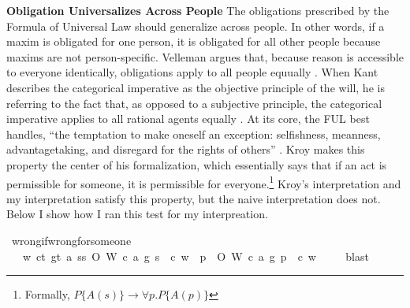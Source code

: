 \begin{isabellebody}
%
\begin{isamarkuptext}%
\medskip
\noindent \textbf{Obligation Universalizes Across People} The obligations prescribed by the Formula of Universal Law
should generalize across people. In other words, if a maxim is obligated for one person, it is obligated
for all other people because maxims are not person-specific. Velleman argues that, because 
reason is accessible to everyone identically, obligations apply to all people equually \citep[25]{velleman}. 
When Kant describes the categorical imperative as the objective principle of the will, he is referring 
to the fact that, as opposed to a subjective principle, the categorical imperative applies to all 
rational agents equally \citep[16]{groundwork}. At its core, the FUL best handles, ``the temptation 
to make oneself an exception: selfishness, meanness, advantagetaking, and disregard for the rights 
of others'' \citep[30]{KorsgaardFUL}. Kroy makes this property the center of his
formalization, which essentially says that if an act is permissible for someone, it is permissible for 
everyone.\footnote{Formally, $P\{A(s)\} \longrightarrow \forall p. P\{A(p)\}$} Kroy's interpretation and 
my interpretation satisfy this property, but the naive interpretation does not. Below I show how I 
ran this test for my interpreation.%
\end{isamarkuptext}\isamarkuptrue%
\isamarkupfalse%
\ wrong{\isacharunderscore}if{\isacharunderscore}wrong{\isacharunderscore}for{\isacharunderscore}someone{\isacharcolon}\isanewline
\ \ \ {\isachardoublequoteopen}{\isasymforall}w{\isachardot}\ {\isasymforall}c{\isacharcolon}{\isacharcolon}t{\isachardot}\ {\isasymforall}g{\isacharcolon}{\isacharcolon}t{\isachardot}\ {\isasymforall}a{\isachardot}\ {\isasymexists}s{\isacharcolon}{\isacharcolon}s{\isachardot}\ O{\isacharbraceleft}\isactrlbold {\isasymnot}\ {\isacharparenleft}W\ {\isacharparenleft}c{\isacharcomma}\ a{\isacharcomma}\ g{\isacharparenright}\ s{\isacharparenright}\ {\isacharbar}\ c{\isacharbraceright}\ w\ {\isasymlongrightarrow}\ {\isacharparenleft}{\isasymforall}p{\isachardot}\ \ O{\isacharbraceleft}\isactrlbold {\isasymnot}\ {\isacharparenleft}W\ {\isacharparenleft}c{\isacharcomma}\ a{\isacharcomma}\ g{\isacharparenright}\ p{\isacharparenright}\ {\isacharbar}\ c{\isacharbraceright}\ w{\isacharparenright}\ {\isachardoublequoteclose}\isanewline
%
\isadelimproof
\ \ %
\endisadelimproof
%
\isatagproof
{}\isamarkupfalse%
\ blast\isanewline
%
\end{isabellebody}
